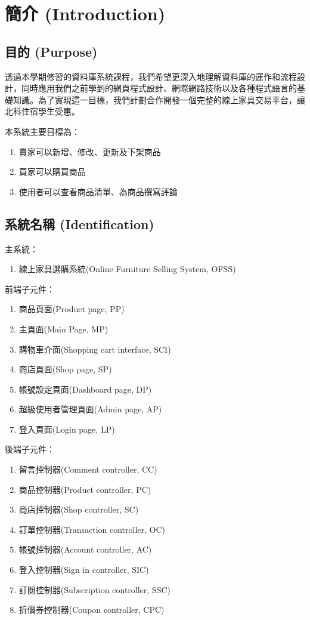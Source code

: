\documentclass[a4paper, 12pt]{article}
\begin{document}

\section{簡介 (Introduction)}

\subsection{目的 (Purpose)}

透過本學期修習的資料庫系統課程，我們希望更深入地理解資料庫的運作和流程設計，同時應用我們之前學到的網頁程式設計、網際網路技術以及各種程式語言的基礎知識。為了實現這一目標，我們計劃合作開發一個完整的線上家具交易平台，讓北科住宿學生受惠。

本系統主要目標為：
\begin{enumerate}
  \item 賣家可以新增、修改、更新及下架商品
  \item 買家可以購買商品
  \item 使用者可以查看商品清單、為商品撰寫評論
\end{enumerate}

\subsection{系統名稱 (Identification)}
主系統：
\begin{enumerate}
    \item 線上家具選購系統(Online Furniture Selling System, OFSS)
\end{enumerate}
前端子元件：
\begin{enumerate}
    \item 商品頁面(Product page, PP)
    \item 主頁面(Main Page, MP)
    \item 購物車介面(Shopping cart interface, SCI)
    \item 商店頁面(Shop page, SP)
    \item 帳號設定頁面(Dashboard page, DP)
    \item 超級使用者管理頁面(Admin page, AP)
    \item 登入頁面(Login page, LP)
\end{enumerate}
後端子元件：
\begin{enumerate}
  \item 留言控制器(Comment controller, CC)
  \item 商品控制器(Product controller, PC)
  \item 商店控制器(Shop controller, SC)
  \item 訂單控制器(Transaction controller, OC)
  \item 帳號控制器(Account controller, AC)
  \item 登入控制器(Sign in controller, SIC)
  \item 訂閱控制器(Subscription controller, SSC)
  \item 折價券控制器(Coupon controller, CPC)
  
\end{enumerate}
\end{document}
